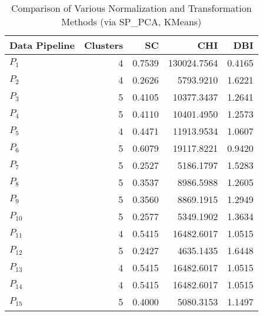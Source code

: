 \begin{table}[t]
\centering
\caption{Comparison of Various Normalization and Transformation Methods (via SP_PCA, KMeans)}
\label{tbl:Comparison_SP_PCA_KMeans_norm_tran}
\begin{tabular}{lrrrr}
\toprule
Data Pipeline &  Clusters &     SC &         CHI &    DBI \\
\midrule
      $P_{1}$ &         4 & 0.7539 & 130024.7564 & 0.4165 \\
      $P_{2}$ &         4 & 0.2626 &   5793.9210 & 1.6221 \\
      $P_{3}$ &         5 & 0.4105 &  10377.3437 & 1.2641 \\
      $P_{4}$ &         5 & 0.4110 &  10401.4950 & 1.2573 \\
      $P_{5}$ &         4 & 0.4471 &  11913.9534 & 1.0607 \\
      $P_{6}$ &         5 & 0.6079 &  19117.8221 & 0.9420 \\
      $P_{7}$ &         5 & 0.2527 &   5186.1797 & 1.5283 \\
      $P_{8}$ &         5 & 0.3537 &   8986.5988 & 1.2605 \\
      $P_{9}$ &         5 & 0.3560 &   8869.1915 & 1.2949 \\
     $P_{10}$ &         5 & 0.2577 &   5349.1902 & 1.3634 \\
     $P_{11}$ &         4 & 0.5415 &  16482.6017 & 1.0515 \\
     $P_{12}$ &         5 & 0.2427 &   4635.1435 & 1.6448 \\
     $P_{13}$ &         4 & 0.5415 &  16482.6017 & 1.0515 \\
     $P_{14}$ &         4 & 0.5415 &  16482.6017 & 1.0515 \\
     $P_{15}$ &         5 & 0.4000 &   5080.3153 & 1.1497 \\
\bottomrule
\end{tabular}
\end{table}
